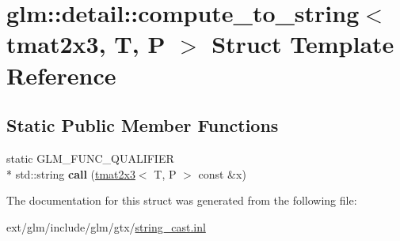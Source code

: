 \hypertarget{structglm_1_1detail_1_1compute__to__string_3_01tmat2x3_00_01_t_00_01_p_01_4}{\section{glm\-:\-:detail\-:\-:compute\-\_\-to\-\_\-string$<$ tmat2x3, T, P $>$ Struct Template Reference}
\label{structglm_1_1detail_1_1compute__to__string_3_01tmat2x3_00_01_t_00_01_p_01_4}
}
\subsection*{Static Public Member Functions}
\begin{DoxyCompactItemize}
\item 
\hypertarget{structglm_1_1detail_1_1compute__to__string_3_01tmat2x3_00_01_t_00_01_p_01_4_a69b0cc0650365f45aaf4c5aba6819abc}{static G\-L\-M\-\_\-\-F\-U\-N\-C\-\_\-\-Q\-U\-A\-L\-I\-F\-I\-E\-R \\*
std\-::string {\bfseries call} (\hyperlink{structglm_1_1tmat2x3}{tmat2x3}$<$ T, P $>$ const \&x)}\label{structglm_1_1detail_1_1compute__to__string_3_01tmat2x3_00_01_t_00_01_p_01_4_a69b0cc0650365f45aaf4c5aba6819abc}

\end{DoxyCompactItemize}


The documentation for this struct was generated from the following file\-:\begin{DoxyCompactItemize}
\item 
ext/glm/include/glm/gtx/\hyperlink{string__cast_8inl}{string\-\_\-cast.\-inl}\end{DoxyCompactItemize}
